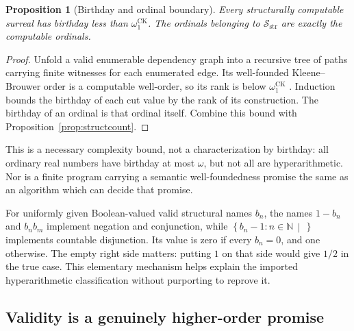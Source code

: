 \documentclass[11pt,letterpaper]{article}
\numberwithin{equation}{section}
\newtheorem{proposition}[theorem]{Proposition}
\theoremstyle{definition}
\theoremstyle{remark}
\newcommand{\Sc}{\mathcal S_{\mathrm{str}}}
\newcommand{\N}{\mathbb N}
\newcommand{\cut}[2]{\left\{#1\,\middle|\,#2\right\}}
\newcommand{\CK}{\omega_1^{\mathrm{CK}}}
\begin{document}
\begin{proposition}[Birthday and ordinal boundary]\label{prop:ordinal-boundary}
Every structurally computable surreal has birthday less than $\CK$.
The ordinals belonging to $\Sc$ are exactly the computable ordinals.
\end{proposition}
\begin{proof}
Unfold a valid enumerable dependency graph into a recursive tree of paths
carrying finite witnesses for each enumerated edge. Its well-founded
Kleene--Brouwer order is a computable well-order, so its rank is below $\CK$
\cite{sacks}. Induction bounds the birthday of each cut value by the rank
of its construction. The birthday of an ordinal is that ordinal itself.
Combine this bound with Proposition~\ref{prop:structcount}.
\end{proof}
This is a necessary complexity bound, not a characterization by birthday:
all ordinary real numbers have birthday at most $\omega$, but not all are
hyperarithmetic. Nor is a finite program carrying a semantic well-foundedness
promise the same as an algorithm which can decide that promise.

For uniformly given Boolean-valued valid structural names $b_n$, the names
$1-b_n$ and $b_nb_m$ implement negation and conjunction, while
$\cut{b_n-1:n\in\N}{}$ implements countable disjunction. Its value is zero
if every $b_n=0$, and one otherwise. The empty right side matters: putting
$1$ on that side would give $1/2$ in the true case. This elementary mechanism
helps explain the imported hyperarithmetic classification without purporting
to reprove it.

\subsection{Validity is a genuinely higher-order promise}
\end{document}
